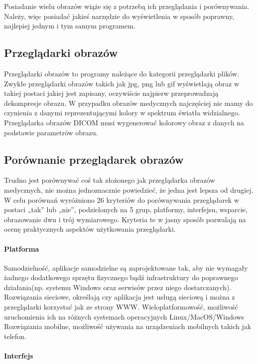 
Posiadanie wielu obrazów wiąże się z potrzebą ich przeglądania i porównywania.
Należy, więc posiadać jakieś narzędzie do wyświetlenia w sposób poprawny, najlepiej jednym i tym samym programem.

\subsection{Przeglądarki obrazów}

Przeglądarki obrazów to programy należące do kategorii przeglądarki plików.
Zwykłe przeglądarki obrazów takich jak jpg, png lub gif wyświetlają obraz w takiej postaci jakiej jest zapisany, oczywiście najpierw przeprowadzają dekompresje obrazu.
W przypadku obrazów medycznych najczęściej nie mamy do czynienia z danymi reprezentującymi kolory w spektrum światła widzialnego.
Przeglądarka obrazów DICOM musi wygenerować kolorowy obraz z danych na podstawie parametrów obrazu.

\subsection{Porównanie przeglądarek obrazów}

Trudno jest porównywać coś tak złożonego jak przeglądarka obrazów medycznych, nie można jednoznacznie powiedzieć, że jedna jest lepsza od drugiej. W celu porównań wyróżniono 26 kryteriów do porównywania przeglądarek w postaci „tak” lub „nie”, podzielonych na 5 grup, platformy, interfejsu, wsparcie, obrazowanie dwu i trój wymiarowego.
Kryteria te w jasny sposób pozwalają na ocenę praktycznych aspektów użytkowania przeglądarki.

\paragraph{Platforma}

Samodzielność, aplikacje samodzielne są zaprojektowane tak, aby nie wymagały żadnego dodatkowego sprzętu fizycznego bądź infrastruktury do poprawnego działania(np. systemu Windows oraz serwisów przez niego dostarczanych).
Rozwiązania sieciowe, określają czy aplikacja jest usługą sieciową i można z przeglądarki korzystać jak ze strony WWW.
Wieloplatformowość, możliwość uruchomienia ich na różnych systemach operacyjnych Linux/MacOS/Windows
Rozwiązania mobilne, możliwość używania na urządzeniach mobilnych takich jak telefon.

\paragraph{Interfejs}

